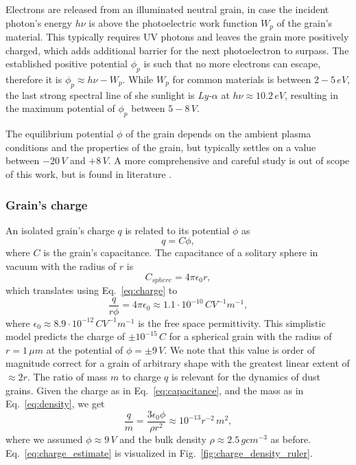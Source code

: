 Electrons are released from an illuminated neutral grain, in case the incident photon's energy $h\nu$ is above the photoelectric work function $W_{p}$ of the grain's material. This typically requires UV photons and leaves the grain more positively charged, which adds additional barrier for the next photoelectron to surpass. The established positive potential $\phi_{p}$ is such that no more electrons can escape, therefore it is $\phi_{p} \approx h\nu - W_{p}$. While $W_p$ for common materials is between $2 - 5 \, \si{eV}$, the last strong spectral line of she sunlight is \textit{Ly-$\alpha$} at $h\nu \approx 10.2 \, \si{eV}$, resulting in the maximum potential of $\phi_p$ between $5 - 8 \, \si{V}$. 

The equilibrium potential $\phi$ of the grain depends on the ambient plasma conditions and the properties of the grain, but typically settles on a value between $-20 \, \si{V}$ and $+8 \, \si{V}$. A more comprehensive and careful study is out of scope of this work, but is found in literature \citep{meyer1982flip,horanyi1996charged,krivov1998dynamics,dzhanoev2016charging,vaverka2016lunar}.

\subsubsection{Grain's charge}

An isolated grain's charge $q$ is related to its potential $\phi$ as
\begin{equation}
    q = C \phi, \label{eq:charge}
\end{equation}
where $C$ is the grain's capacitance. The capacitance of a solitary sphere in vacuum with the radius of $r$ is 
\begin{equation}
    C_{sphere} = 4 \pi \epsilon_0 r,
\end{equation}
which translates using Eq.~\ref{eq:charge} to
\begin{equation}
    \frac{q}{r \phi} = 4 \pi \epsilon_0 \approx 1.1 \cdot 10^{-10} \, \si{C V^{-1} m^{-1}},
    \label{eq:capacitance}
\end{equation}
where $\epsilon_0 \approx 8.9\cdot10^{-12} \, \si{C V^{-1} m^{-1}}$ is the free space permittivity. This simplistic model predicts the charge of $\pm 10^{-15} \, \si{C}$ for a spherical grain with the radius of $r = 1 \, \si{\mu m}$ at the potential of $\phi = \pm 9 \, \si{V}$. We note that this value is order of magnitude correct for a grain of arbitrary shape with the greatest linear extent of $\approx 2r$. 
The ratio of mass $m$ to charge $q$ is relevant for the dynamics of dust grains. Given the charge as in Eq.~\ref{eq:capacitance}, and the mass as in Eq.~\ref{eq:density}, we get
\begin{equation}
    \frac{q}{m} = \frac{3 \epsilon_0 \phi}{\rho r^2} \approx 10^{-13} r^{-2} \, \si{m^2},
    \label{eq:charge_estimate}
\end{equation}
where we assumed $\phi \approx 9 \, \si{V}$ and the bulk density $\rho \approx 2.5 \, \si{g cm^{-3}}$ as before. Eq.~\ref{eq:charge_estimate} is visualized in Fig.~\ref{fig:charge_density_ruler}.

